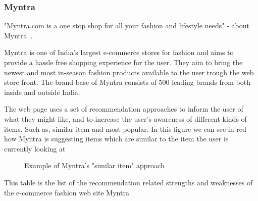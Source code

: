 \subsubsection{Myntra}
\label{par:myntra}

"Myntra.com is a one stop shop for all your fashion and lifestyle needs" -
about Myntra~\cite{myntra}.

Myntra is one of India's largest e-commerce stores for fashion and aims to
provide a hassle free shopping experience for the user.  They aim to bring the
newest and most in-season fashion products available to the user trough the web
store front.  The brand base of Myntra consists of 500 leading brands from both
inside and outside India.

The web page uses a set of recommendation approaches to inform the user of what
they might like, and to increase the user's awareness of different kinds of
items. Such as, similar item and most popular. In this figure we can see in red
how Myntra is suggesting items which are similar to the item the user is
currently looking at

\begin{figure}[H]
    \centering
    \caption[Example of Myntra's "similar item" approach]{Example of Myntra's
    "similar item" approach}
    \label{figure:myntiaSimilarEx}
\end{figure}

This table is the list of the recommendation related strengths and weaknesses
of the e-commerce fashion web site Myntra~\cite{myntra}

